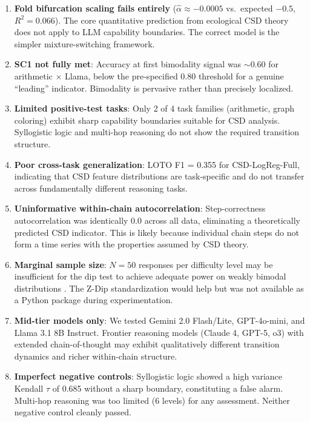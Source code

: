 \documentclass[11pt,letterpaper]{article}
\begin{document}
\begin{enumerate}
    \item \textbf{Fold bifurcation scaling fails entirely} ($\hat{\alpha} \approx -0.0005$ vs.\ expected $-0.5$, $R^2 = 0.066$). The core quantitative prediction from ecological CSD theory does not apply to LLM capability boundaries. The correct model is the simpler mixture-switching framework.
    \item \textbf{SC1 not fully met}: Accuracy at first bimodality signal was $\sim$0.60 for arithmetic $\times$ Llama, below the pre-specified 0.80 threshold for a genuine ``leading'' indicator. Bimodality is pervasive rather than precisely localized.
    \item \textbf{Limited positive-test tasks}: Only 2 of 4 task families (arithmetic, graph coloring) exhibit sharp capability boundaries suitable for CSD analysis. Syllogistic logic and multi-hop reasoning do not show the required transition structure.
    \item \textbf{Poor cross-task generalization}: LOTO F1 = 0.355 for CSD-LogReg-Full, indicating that CSD feature distributions are task-specific and do not transfer across fundamentally different reasoning tasks.
    \item \textbf{Uninformative within-chain autocorrelation}: Step-correctness autocorrelation was identically 0.0 across all data, eliminating a theoretically predicted CSD indicator. This is likely because individual chain steps do not form a time series with the properties assumed by CSD theory.
    \item \textbf{Marginal sample size}: $N=50$ responses per difficulty level may be insufficient for the dip test to achieve adequate power on weakly bimodal distributions \cite{hartigan1985, silverman1981}. The Z-Dip standardization \cite{kang2019} would help but was not available as a Python package during experimentation.
    \item \textbf{Mid-tier models only}: We tested Gemini 2.0 Flash/Lite, GPT-4o-mini, and Llama 3.1 8B Instruct. Frontier reasoning models (Claude 4, GPT-5, o3) with extended chain-of-thought may exhibit qualitatively different transition dynamics and richer within-chain structure.
    \item \textbf{Imperfect negative controls}: Syllogistic logic showed a high variance Kendall $\tau$ of 0.685 without a sharp boundary, constituting a false alarm. Multi-hop reasoning was too limited (6 levels) for any assessment. Neither negative control cleanly passed.
\end{enumerate}
\end{document}
